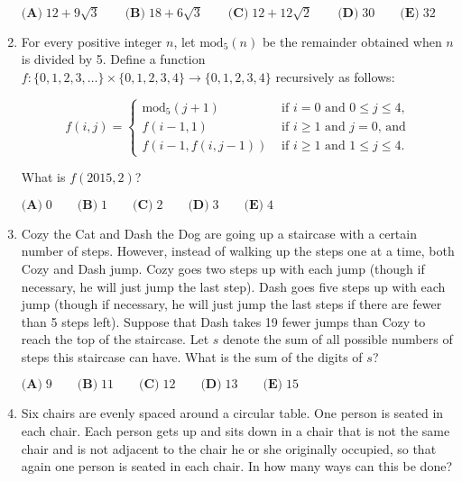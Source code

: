 \documentclass{article}
\begin{document}
\begin{enumerate}[label=\arabic*., itemsep=0.5em]
\(\textbf{(A)}\; 12+9\sqrt{3} \qquad\textbf{(B)}\; 18+6\sqrt{3} \qquad\textbf{(C)}\; 12+12\sqrt{2} \qquad\textbf{(D)}\; 30 \qquad\textbf{(E)}\; 32\)\par \vspace{0.5em}\item For every positive integer \(n\), let \(\text{mod}_5 (n)\) be the remainder obtained when \(n\) is divided by 5. Define a function \(f: \{0,1,2,3,\dots\} \times \{0,1,2,3,4\} \to \{0,1,2,3,4\}\) recursively as follows:


\begin{equation*}
f(i,j) = \begin{cases}\text{mod}_5 (j+1) & \text{ if } i = 0 \text{ and } 0 \le j \le 4 \text{,}\\
f(i-1,1) & \text{ if } i \ge 1 \text{ and } j = 0 \text{, and} \\
f(i-1, f(i,j-1)) & \text{ if } i \ge 1 \text{ and } 1 \le j \le 4.
\end{cases}
\end{equation*}
  

What is \(f(2015,2)\)?

\(\textbf{(A)}\; 0 \qquad\textbf{(B)}\; 1 \qquad\textbf{(C)}\; 2 \qquad\textbf{(D)}\; 3 \qquad\textbf{(E)}\; 4\)\par \vspace{0.5em}\item Cozy the Cat and Dash the Dog are going up a staircase with a certain number of steps. However, instead of walking up the steps one at a time, both Cozy and Dash jump. Cozy goes two steps up with each jump (though if necessary, he will just jump the last step). Dash goes five steps up with each jump (though if necessary, he will just jump the last steps if there are fewer than 5 steps left). Suppose that Dash takes 19 fewer jumps than Cozy to reach the top of the staircase. Let \(s\) denote the sum of all possible numbers of steps this staircase can have. What is the sum of the digits of \(s\)?

\(\textbf{(A)}\; 9 \qquad\textbf{(B)}\; 11 \qquad\textbf{(C)}\; 12 \qquad\textbf{(D)}\; 13 \qquad\textbf{(E)}\; 15\)\par \vspace{0.5em}\item Six chairs are evenly spaced around a circular table. One person is seated in each chair. Each person gets up and sits down in a chair that is not the same chair and is not adjacent to the chair he or she originally occupied, so that again one person is seated in each chair. In how many ways can this be done?


\end{enumerate}
\end{document}
